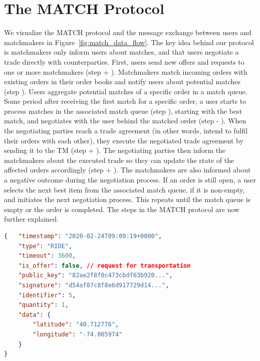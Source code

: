 \section{The MATCH Protocol}
\label{sec:protocol}
We visualize the MATCH protocol and the message exchange between users and matchmakers in Figure~\ref{fig:match_data_flow}.
The key idea behind our protocol is matchmakers only inform users about matches, and that users negotiate a trade directly with counterparties.
First, users send new offers and requests to one or more matchmakers (step  + ).
Matchmakers match incoming orders with existing orders in their order books and notify users about potential matches (step ).
Users aggregate potential matches of a specific order in a match queue.
Some period after receiving the first match for a specific order, a user starts to process matches in the associated match queue (step ), starting with the best match, and negotiates with the user behind the matched order (step  - ).
When the negotiating parties reach a trade agreement (in other words, intend to fulfil their orders with each other), they execute the negotiated trade agreement by sending it to the TM (step  + ).
The negotiating parties then inform the matchmakers about the executed trade so they can update the state of the affected orders accordingly (step  + ).
The matchmakers are also informed about a negative outcome during the negotiation process.
If an order is still open, a user selects the next best item from the associated match queue, if it is non-empty, and initiates the next negotiation process.
This repeats until the match queue is empty or the order is completed.
The steps in the MATCH protocol are now further explained.

\begin{lstlisting}[language=json,firstnumber=1,float=b,caption=An order in a ride-hailing market (in JSON format).,label=lst:order_example]
{	"timestamp": "2020-02-24T09:09:19+0000",
	"type": "RIDE",
	"timeout": 3600,
	"is_offer": false, // request for transportation
	"public_key": "82ae2f8f0c473cbdf63b920...",
	"signature": "d54af87c8f8e6d917729d14...",
	"identifier": 5,
	"quantity": 1,
	"data": {
		"latitude": "40.712776",
		"longitude": "-74.005974"
	}
}
\end{lstlisting}

